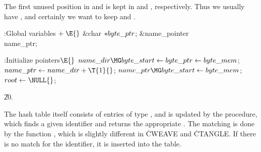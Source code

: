 The first unused position in  and  is
kept in  and , respectively.  Thus we
usually have , and
certainly
we want to keep  and .

\Y\B\4:Global variables\X${}\mathrel+\E{}$\6
\&{char} ${}{*}\\{byte\_ptr}{}$;\6
\&{name\_pointer} \\{name\_ptr};\par
\fi

\B{}:Initialize pointers\X${}\E{}$\6
$\\{name\_dir}\MG\\{byte\_start}\K\\{byte\_ptr}\K\\{byte\_mem}{}$;\6
${}\\{name\_ptr}\K\\{name\_dir}+\T{1}{}$;\6
${}\\{name\_ptr}\MG\\{byte\_start}\K\\{byte\_mem}{}$;\6
${}\\{root}\K\NULL{}$;\par
\U20.\fi

The hash table itself
consists of  entries of type , and is
updated by the  procedure, which finds a given identifier
and returns the appropriate . The matching is done by the
function , which is slightly different in
\.{CWEAVE} and \.{CTANGLE}.  If there is no match for the identifier,
it is inserted into the table.


